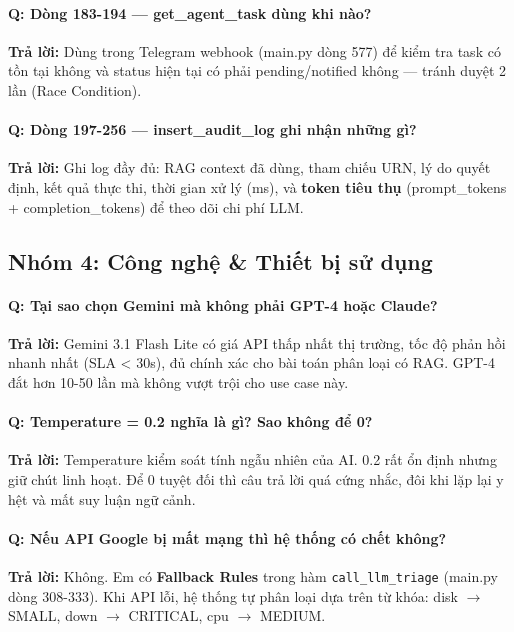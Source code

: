 \documentclass[12pt,a4paper]{article}
\begin{document}
\paragraph{Q: Dòng 183-194 — get\_agent\_task dùng khi nào?}
\textbf{Trả lời:} Dùng trong Telegram webhook (main.py dòng 577) để kiểm tra task có tồn tại không và status hiện tại có phải pending/notified không — tránh duyệt 2 lần (Race Condition).

\paragraph{Q: Dòng 197-256 — insert\_audit\_log ghi nhận những gì?}
\textbf{Trả lời:} Ghi log đầy đủ: RAG context đã dùng, tham chiếu URN, lý do quyết định, kết quả thực thi, thời gian xử lý (ms), và \textbf{token tiêu thụ} (prompt\_tokens + completion\_tokens) để theo dõi chi phí LLM.

\subsection{Nhóm 4: Công nghệ \& Thiết bị sử dụng}

\paragraph{Q: Tại sao chọn Gemini mà không phải GPT-4 hoặc Claude?}
\textbf{Trả lời:} Gemini 3.1 Flash Lite có giá API thấp nhất thị trường, tốc độ phản hồi nhanh nhất (SLA < 30s), đủ chính xác cho bài toán phân loại có RAG. GPT-4 đắt hơn 10-50 lần mà không vượt trội cho use case này.

\paragraph{Q: Temperature = 0.2 nghĩa là gì? Sao không để 0?}
\textbf{Trả lời:} Temperature kiểm soát tính ngẫu nhiên của AI. 0.2 rất ổn định nhưng giữ chút linh hoạt. Để 0 tuyệt đối thì câu trả lời quá cứng nhắc, đôi khi lặp lại y hệt và mất suy luận ngữ cảnh.

\paragraph{Q: Nếu API Google bị mất mạng thì hệ thống có chết không?}
\textbf{Trả lời:} Không. Em có \textbf{Fallback Rules} trong hàm \texttt{call\_llm\_triage} (main.py dòng 308-333). Khi API lỗi, hệ thống tự phân loại dựa trên từ khóa: disk $\rightarrow$ SMALL, down $\rightarrow$ CRITICAL, cpu $\rightarrow$ MEDIUM.
\end{document}
